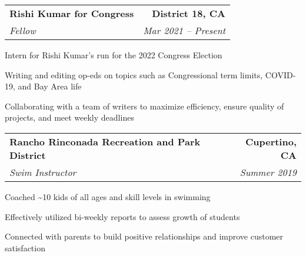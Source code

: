 \documentclass{article}
\newlength{\secskip}
\begin{document}
\goodbreak\vspace{\secskip}\par\noindent\begin{tabularx}{\linewidth}{Xr}
    \textbf{Rishi Kumar for Congress} & \textbf{District 18, CA}\\
    \textit{Fellow} & \textit{Mar 2021 -- Present}\\
\end{tabularx}
\begin{compactitem}
\item Intern for Rishi Kumar's run for the 2022 Congress Election
\item Writing and editing op-eds on topics such as Congressional term limits, COVID-19, and Bay Area life
\item Collaborating with a team of writers to maximize efficiency, ensure quality of projects, and meet weekly deadlines
\end{compactitem}

\goodbreak\vspace{\secskip}\par\noindent\begin{tabularx}{\linewidth}{Xr}
    \textbf{Rancho Rinconada Recreation and Park District} & \textbf{Cupertino, CA}\\
    \textit{Swim Instructor} & \textit{Summer 2019}\\
\end{tabularx}
\begin{compactitem}
\item Coached \textasciitilde{}10 kids of all ages and skill levels in swimming
\item Effectively utilized bi-weekly reports to assess growth of students
\item Connected with parents to build positive relationships and improve customer satisfaction
\end{compactitem}

    
\end{document}
